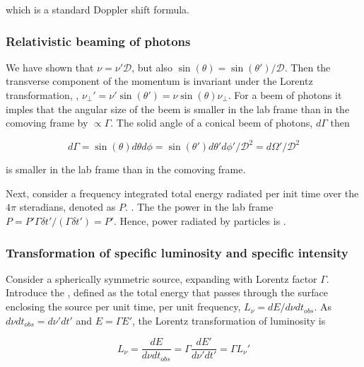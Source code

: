 which is a standard Doppler shift formula.


\subsubsection{Relativistic beaming of photons}

We have shown that $\nu = \nu' \mathcal{D}$, but also $\sin(\theta) = \sin(\theta')/\mathcal{D}$. Then the transverse component of the momentum is invariant under the Lorentz transformation, \eg, $\nu_{\perp}' = \nu'\sin(\theta') = \nu\sin(\theta) \nu_{\perp}$. 
For a beem of photons it imples that the angular size of the beem is smaller in the lab frame than in the comoving frame by $\propto \Gamma$.
The solid angle of a conical beem of photons, $d\Gamma$ then 

\begin{equation}
d\Gamma = \sin(\theta)d\theta d\phi = \sin(\theta') d\theta' d\phi' / \mathcal{D}^2 = d\Omega'/\mathcal{D}^2
\end{equation}

is smaller in the lab frame than in the comoving frame.

Next, consider a frequency integrated total energy radiated per init time over the $4\pi$ steradians, denoted as $P$. 
 .
The the power in the lab frame $P = P'\Gamma\delta t'/(\Gamma\delta t') = P'$. 
Hence, power radiated by particles is .


\subsubsection{Transformation of specific luminosity and specific intensity}

Consider a spherically symmetric source, expanding with Lorentz factor $\Gamma$. 
Introduce the , defined as the total energy that passes through the surface enclosing the source per unit time, per unit frequency, $L_{\nu} = dE / d\nu dt_{obs}$. 
As $d\nu dt_{obs} = d\nu' dt'$ and $E=\Gamma E'$, the Lorentz transformation of luminosity is

\begin{equation}
L_{\nu} = \frac{dE}{d\nu dt_{obs}} = \Gamma \frac{dE'}{d\nu' dt'} = \Gamma L_{\nu}'
\end{equation}

